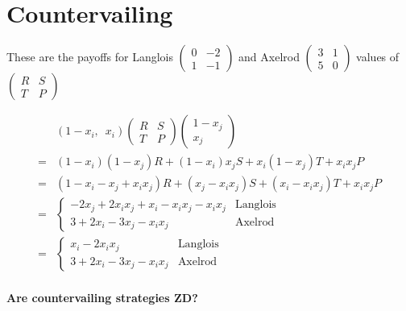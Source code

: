 

\chapter{Countervailing}

These are the payoffs for Langlois 
$\left(
	\begin{array}{cc}
		0 & -2 \\
		1 & -1
	\end{array}
\right)
$
and Axelrod
$
\left(
	\begin{array}{cc}
		3 & 1 \\
		5 & 0
	\end{array}
\right)
$
values of
$
\left(
	\begin{array}{cc}
		R & S \\
		T & P
	\end{array}
\right)
$

\begin{align*}
&(1-x_i,\enspace x_i) 
\left(
	\begin{array}{cc}
		R & S \\
		T & P
	\end{array}
\right)
\left(
	\begin{array}{c}
	1-x_j \\
	x_j
	\end{array}
\right)
\\
= &(1-x_i)(1-x_j) R + (1-x_i)x_j S + x_i(1-x_j)T + x_i x_j P
\\
= &(1 - x_i - x_j + x_i x_j)R + (x_j - x_i x_j)S + (x_i - x_i x_j)T + x_i x_j P
\\
=& \begin{cases}
      	-2 x_j + 2 x_i x_j + x_i - x_i x_j - x_i x_j 	& \textrm{Langlois}\\
	3 + 2x_i - 3x_j - x_i x_j 				&\textrm{Axelrod}
      \end{cases}
\\
=& \begin{cases}
	x_i - 2x_i x_j			& \textrm{Langlois}	\\
	3 + 2x_i - 3x_j - x_i x_j 	&\textrm{Axelrod}
      \end{cases}
\end{align*}


\subsubsection{Are countervailing strategies ZD?}

